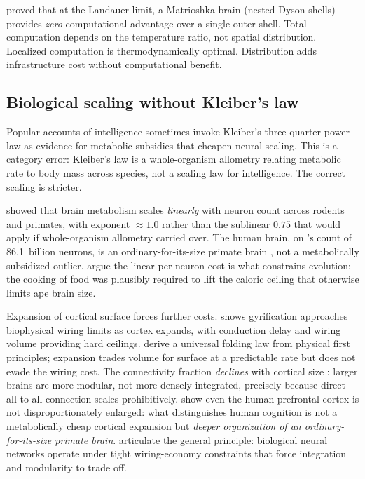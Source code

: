 \documentclass[11pt,a4paper,twocolumn]{article}
\begin{document}
\citet{wright2023} proved that at the Landauer limit, a Matrioshka brain
(nested Dyson shells) provides \emph{zero} computational advantage over
a single outer shell. Total computation depends on the temperature
ratio, not spatial distribution. Localized computation is
thermodynamically optimal. Distribution adds infrastructure cost without
computational benefit.

\subsection{Biological scaling without Kleiber's law}

Popular accounts of intelligence sometimes invoke Kleiber's three-quarter
power law as evidence for metabolic subsidies that cheapen neural scaling.
This is a category error: Kleiber's law is a whole-organism allometry
relating metabolic rate to body mass across species, not a scaling law
for intelligence. The correct scaling is stricter.

\citet{herculanohouzel2011} showed that brain metabolism scales
\emph{linearly} with neuron count across rodents and primates, with
exponent $\approx 1.0$ rather than the sublinear $0.75$ that would apply
if whole-organism allometry carried over. The human brain, on
\citet{azevedo2009}'s count of 86.1~billion neurons, is an
ordinary-for-its-size primate brain \citep{herculanohouzel2012}, not a
metabolically subsidized outlier. \citet{fonseca2012} argue the
linear-per-neuron cost is what constrains evolution: the cooking of food
was plausibly required to lift the caloric ceiling that otherwise limits
ape brain size.

Expansion of cortical surface forces further costs.
\citet{hofman2014} shows gyrification approaches biophysical wiring
limits as cortex expands, with conduction delay and wiring volume
providing hard ceilings. \citet{mota2015} derive a universal folding
law from physical first principles; expansion trades volume for surface
at a predictable rate but does not evade the wiring cost. The
connectivity fraction \emph{declines} with cortical size
\citep{herculanohouzel2010}: larger brains are more modular, not more
densely integrated, precisely because direct all-to-all connection
scales prohibitively. \citet{gabi2016} show even the human prefrontal
cortex is not disproportionately enlarged: what distinguishes human
cognition is not a metabolically cheap cortical expansion but
\emph{deeper organization of an ordinary-for-its-size primate brain}.
\citet{bullmore2012} articulate the general principle: biological
neural networks operate under tight wiring-economy constraints that
force integration and modularity to trade off.
\end{document}
